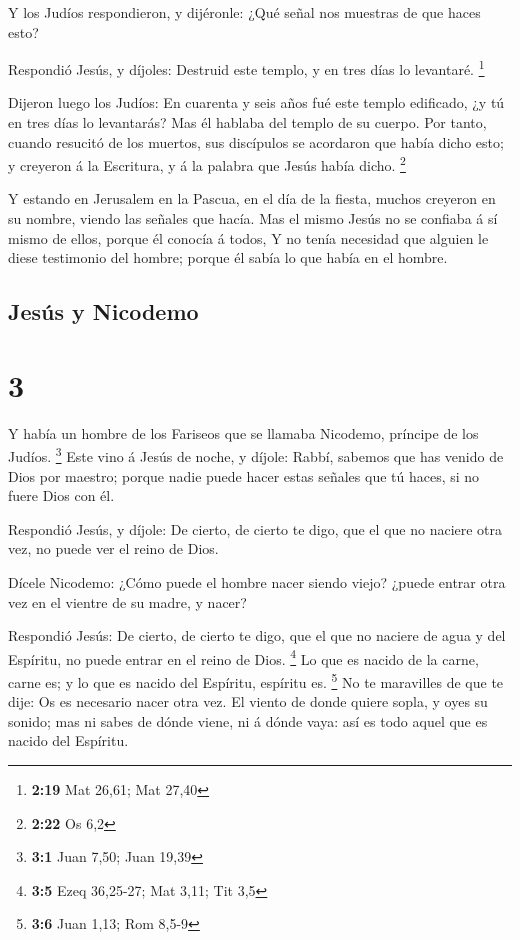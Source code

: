  Y los Judíos respondieron, y dijéronle: ¿Qué señal nos
muestras de que haces esto?

 Respondió Jesús, y díjoles: Destruid este templo, y en
tres días lo levantaré. \footnote{\textbf{2:19} Mat 26,61; Mat 27,40}

 Dijeron luego los Judíos: En cuarenta y seis años fué este
templo edificado, ¿y tú en tres días lo levantarás?  Mas él
hablaba del templo de su cuerpo.  Por tanto, cuando
resucitó de los muertos, sus discípulos se acordaron que había dicho
esto; y creyeron á la Escritura, y á la palabra que Jesús había dicho.
\footnote{\textbf{2:22} Os 6,2}

 Y estando en Jerusalem en la Pascua, en el día de la
fiesta, muchos creyeron en su nombre, viendo las señales que hacía.
 Mas el mismo Jesús no se confiaba á sí mismo de ellos,
porque él conocía á todos,  Y no tenía necesidad que
alguien le diese testimonio del hombre; porque él sabía lo que había en
el hombre.

\hypertarget{jesuxfas-y-nicodemo}{%
\subsection{Jesús y Nicodemo}\label{jesuxfas-y-nicodemo}}

\hypertarget{section-2}{%
\section{3}\label{section-2}}

 Y había un hombre de los Fariseos que se llamaba Nicodemo,
príncipe de los Judíos. \footnote{\textbf{3:1} Juan 7,50; Juan 19,39}
 Este vino á Jesús de noche, y díjole: Rabbí, sabemos que
has venido de Dios por maestro; porque nadie puede hacer estas señales
que tú haces, si no fuere Dios con él.

 Respondió Jesús, y díjole: De cierto, de cierto te digo,
que el que no naciere otra vez, no puede ver el reino de Dios.

 Dícele Nicodemo: ¿Cómo puede el hombre nacer siendo viejo?
¿puede entrar otra vez en el vientre de su madre, y nacer?

 Respondió Jesús: De cierto, de cierto te digo, que el que
no naciere de agua y del Espíritu, no puede entrar en el reino de Dios.
\footnote{\textbf{3:5} Ezeq 36,25-27; Mat 3,11; Tit 3,5}  Lo
que es nacido de la carne, carne es; y lo que es nacido del Espíritu,
espíritu es. \footnote{\textbf{3:6} Juan 1,13; Rom 8,5-9} 
No te maravilles de que te dije: Os es necesario nacer otra vez.
 El viento de donde quiere sopla, y oyes su sonido; mas ni
sabes de dónde viene, ni á dónde vaya: así es todo aquel que es nacido
del Espíritu.

